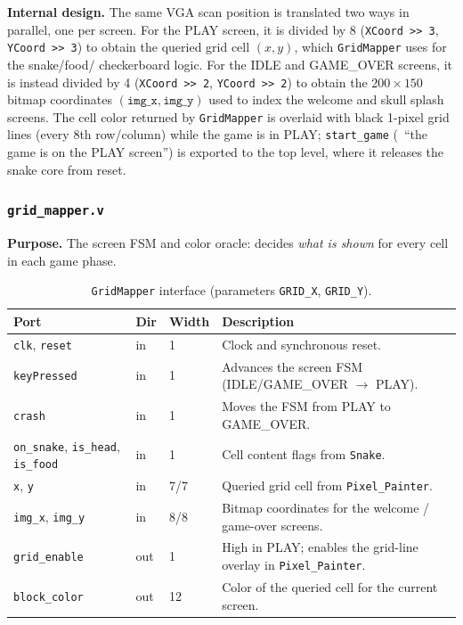 \documentclass[11pt,a4paper]{article}
\begin{document}
\textbf{Internal design.} The same VGA scan position is translated two
ways in parallel, one per screen. For the PLAY screen, it is divided by
8 (\texttt{XCoord >> 3}, \texttt{YCoord >> 3}) to obtain the queried
grid cell $(x,y)$, which \texttt{GridMapper} uses for the snake/food/
checkerboard logic. For the IDLE and GAME\_OVER screens, it is instead
divided by 4 (\texttt{XCoord >> 2}, \texttt{YCoord >> 2}) to obtain the
$200\times150$ bitmap coordinates $(\texttt{img\_x}, \texttt{img\_y})$
used to index the welcome and skull splash screens. The cell color
returned by \texttt{GridMapper} is overlaid with black 1-pixel grid
lines (every 8th row/column) while the game is in PLAY;
\texttt{start\_game} (\ ``the game is on the PLAY screen'') is
exported to the top level, where it releases the snake core from reset.

\subsubsection{\texttt{grid\_mapper.v}}
\textbf{Purpose.} The screen FSM and color oracle: decides \emph{what
is shown} for every cell in each game phase.

\begin{table}[H]
  \centering\small
  \caption{\texttt{GridMapper} interface (parameters \texttt{GRID\_X}, \texttt{GRID\_Y}).}
  \begin{tabular}{lllp{}}
    \toprule
    \textbf{Port} & \textbf{Dir} & \textbf{Width} & \textbf{Description} \\
    \midrule
    \texttt{clk}, \texttt{reset} & in & 1 & Clock and synchronous reset. \\
    \texttt{keyPressed} & in & 1 & Advances the screen FSM
      (IDLE/GAME\_OVER $\rightarrow$ PLAY). \\
    \texttt{crash} & in & 1 & Moves the FSM from PLAY to GAME\_OVER. \\
    \texttt{on\_snake}, \texttt{is\_head}, \texttt{is\_food} & in & 1 &
      Cell content flags from \texttt{Snake}. \\
    \texttt{x}, \texttt{y} & in & 7/7 & Queried grid cell from
      \texttt{Pixel\_Painter}. \\
    \texttt{img\_x}, \texttt{img\_y} & in & 8/8 & Bitmap coordinates for
      the welcome / game-over screens. \\
    \texttt{grid\_enable} & out & 1 & High in PLAY; enables the grid-line
      overlay in \texttt{Pixel\_Painter}. \\
    \texttt{block\_color} & out & 12 & Color of the queried cell for the
      current screen. \\
    \bottomrule
  \end{tabular}
\end{table}
\end{document}
